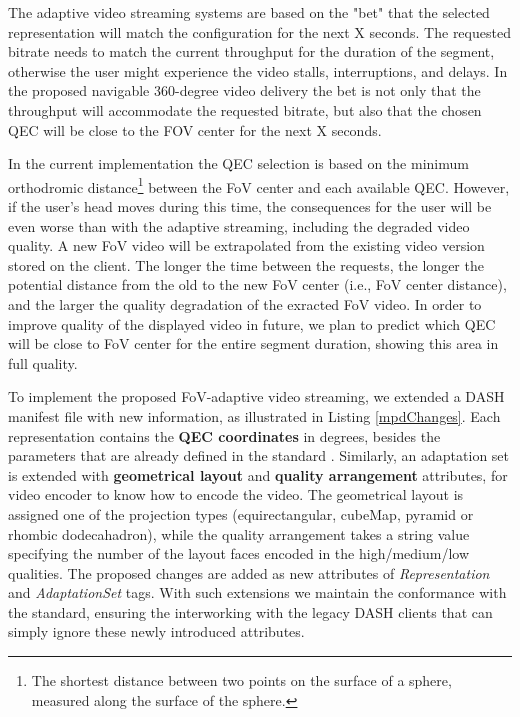  The adaptive video streaming systems are based on the "bet" that the selected representation will match the configuration for the next X seconds. The requested bitrate needs to match the current throughput for the duration of the segment, otherwise the user might experience the video stalls, interruptions, and delays. In the proposed navigable 360-degree video delivery the bet is not only that the throughput will accommodate the requested bitrate, but also that the chosen QEC will be close to the FOV center for the next X seconds.

 In the current implementation the QEC selection is based on the minimum orthodromic distance\footnote{The shortest distance between two points on the surface of a sphere, measured along the surface of the sphere.} between the FoV center and each available QEC. However, if the user's head moves during this time, the consequences for the user will be even worse than with the adaptive streaming, including the degraded video quality. A new FoV video will be extrapolated from the existing video version stored on the client. The longer the time between the requests, the longer the potential distance from the old to the new FoV center (i.e., FoV center distance), and the larger the quality degradation of the exracted FoV video. In order to improve quality of the displayed video in future, we plan to predict which QEC will be close to FoV center for the entire segment duration, showing this area in full quality.


 To implement the proposed FoV-adaptive video streaming, we extended a DASH manifest file with new information, as illustrated in Listing \ref{mpdChanges}. Each representation contains the \textbf{QEC coordinates} in degrees, besides the parameters that are already defined in the standard \cite{iso_iec}. Similarly, an adaptation set is extended with \textbf{geometrical layout} and \textbf{quality arrangement} attributes, for video encoder to know how to encode the video. The geometrical layout is assigned one of the projection types (equirectangular, cubeMap, pyramid or rhombic dodecahadron), while the quality arrangement takes a string value specifying the number of the layout faces encoded in the high/medium/low qualities. The proposed changes are added as new attributes of \textit{Representation} and \textit{AdaptationSet} tags. With such extensions we maintain the conformance with the standard, ensuring the interworking with the legacy DASH clients that can simply ignore these newly introduced attributes.

